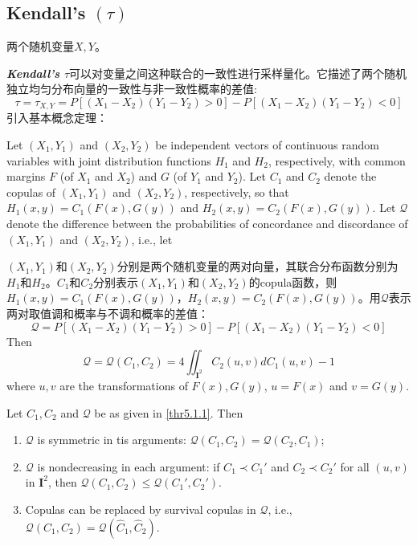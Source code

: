 \subsection{Kendall's $(\tau)$}
两个随机变量$X,Y$。

\emph{\textbf{\textcolor[rgb]{1,0,0}{Kendall's $\tau$}}}可以对变量之间这种联合的一致性进行采样量化。它描述了两个随机独立均匀分布向量的一致性与非一致性概率的差值\cite{Montes2015}:
\begin{equation}
    \tau = \tau_{X,Y} = P[(X_1-X_2)(Y_1-Y_2) > 0] - P[(X_1-X_2)(Y_1-Y_2)<0]
    \label{eq-tau}
\end{equation}
引入基本概念定理：
\begin{theorem}\cite{Bill2000An}
    Let $(X_1,Y_1)$ and $(X_2,Y_2)$ be independent vectors of continuous random variables with joint distribution functions $H_1$ and $H_2$, respectively, with common margins $F$ (of $X_1$ and $X_2$) and $G$ (of $Y_1$ and $Y_2$). Let $C_1$ and $C_2$ denote the copulas of $(X_1,Y_1)$ and $(X_2,Y_2)$, respectively, so that $H_1(x,y) = C_1(F(x), G(y))$ and $H_2(x,y) = C_2(F(x),G(y))$. Let $\mathcal{Q}$ denote the difference between the probabilities of concordance and discordance of $(X_1,Y_1)$ and $(X_2,Y_2)$, i.e., let

    $(X_1,Y_1)$和$(X_2,Y_2)$分别是两个随机变量的两对向量，其联合分布函数分别为$H_1$和$H_2$。$C_1$和$C_2$分别表示$(X_1,Y_1)$和$(X_2,Y_2)$的copula函数，则$H_1(x,y) = C_1(F(x),G(y))$，$H_2(x,y) = C_2(F(x),G(y))$。用$\mathcal{Q}$表示两对取值调和概率与不调和概率的差值：
    \begin{equation}
        \mathcal{Q} = P [(X_1-X_2)(Y_1-Y_2) > 0] - P[(X_1-X_2)(Y_1-Y_2)<0]
        \label{eq-diff}
    \end{equation}
    Then
    \begin{equation}
        \mathcal{Q} = \mathcal{Q}(C_1,C_2) = 4 \iint_{\mathbf{I}^2}C_2(u,v)dC_1(u,v)-1
        \label{eq-diff2}
    \end{equation}
    where $u,v$ are the transformations of $F(x),G(y)$, $u=F(x)$ and $v = G(y)$.
    \label{thr5.1.1}
\end{theorem}
\begin{corollary}
    Let $C_1,C_2$ and $\mathcal{Q}$ be as given in \cref{thr5.1.1}. Then 
    \begin{enumerate}[1.]
        \item $\mathcal{Q}$ is symmetric in tis arguments: $\mathcal{Q}(C_1,C_2) = \mathcal{Q}(C_2,C_1)$;
        \item $\mathcal{Q}$ is nondecreasing in each argument: if $C_1\prec C_1'$ and $C_2 \prec C_2'$ for all $(u,v)$ in $\mathbf{I}^2$, then $\mathcal{Q}(C_1,C_2) \leq \mathcal{Q}(C_1',C_2')$.
        \item Copulas can be replaced by survival copulas in $\mathcal{Q}$, i.e., $\mathcal{Q}(C_1,C_2) = \mathcal{Q}(\hat{C}_1,\hat{C}_2)$.
    \end{enumerate}
    \label{cor5.1.2}
\end{corollary}

